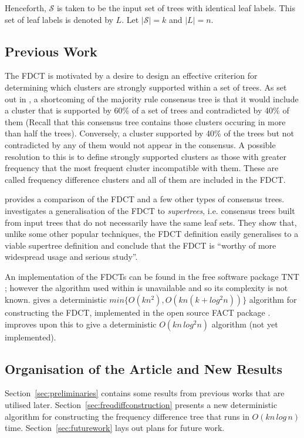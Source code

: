 \documentclass{article}
\begin{document}
    Henceforth, $\mathcal{S}$ is taken to be the input set of trees with identical leaf labels. This set of leaf labels is denoted by $L$. Let $|\mathcal{S}| = k$ and $|L| = n$.

    \subsection{Previous Work}
    The FDCT is motivated by a desire to design an effective criterion for determining which clusters are strongly supported within a set of trees. As set out in \cite{goloboff2003improvements}, a shortcoming of the majority rule consensus tree is that it would include a cluster that is supported by 60\% of a set of trees and contradicted by 40\% of them (Recall that this consensus tree contains those clusters occuring in more than half the trees). Conversely, a cluster supported by 40\% of the trees but not contradicted by any of them would not appear in the consensus. A possible resolution to this is to define strongly supported clusters as those with greater frequency that the most frequent cluster incompatible with them. These are called frequency difference clusters and all of them are included in the FDCT.

    \cite{dong2010majority} provides a comparison of the FDCT and a few other types of consensus trees. \cite{steel2014axiomatic} investigates a generalisation of the FDCT to \textit{supertrees}, i.e. consensus trees built from input trees that do not necessarily have the same leaf sets. They show that, unlike some other popular techniques, the FDCT definition easily generalises to a viable supertree definition and conclude that the FDCT is ``worthy of more widespread usage and serious study''.

    An implementation of the FDCTs can be found in the free software package TNT \cite{goloboff2008tnt}; however the algorithm used within is unavailable and so its complexity is not known. \cite{jansson2018algorithms} gives a deterministic $min\{O(kn^2), O(kn(k + log^2 n))\}$ algorithm for constructing the FDCT, implemented in the open source FACT package \cite{jansson2016improved}. \cite{gawrychowski2017faster} improves upon this to give a deterministic $O(kn\,log^2n)$ algorithm (not yet implemented).

    \subsection{Organisation of the Article and New Results}
    Section~\ref{sec:preliminaries} contains some results from previous works that are utilised later. Section~\ref{sec:freqdiffconstruction} presents a new deterministic algorithm for constructing the frequency difference tree that runs in $O(kn\,log\,n)$ time. Section~\ref{sec:futurework} lays out plans for future work.
\end{document}

